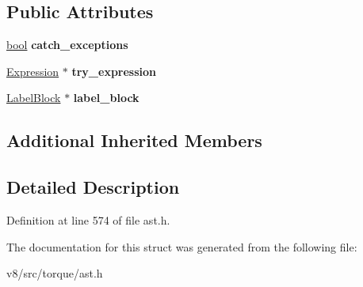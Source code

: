 \subsection*{Public Attributes}
\begin{DoxyCompactItemize}
\item 
\mbox{\label{structv8_1_1internal_1_1torque_1_1TryLabelExpression_a84238bda57547a7930639f5b25481db5}} 
\mbox{\hyperlink{classbool}{bool}} {\bfseries catch\+\_\+exceptions}
\item 
\mbox{\label{structv8_1_1internal_1_1torque_1_1TryLabelExpression_aabeb24711d6fd6e4ae83e3aa50ae45ab}} 
\mbox{\hyperlink{structv8_1_1internal_1_1torque_1_1Expression}{Expression}} $\ast$ {\bfseries try\+\_\+expression}
\item 
\mbox{\label{structv8_1_1internal_1_1torque_1_1TryLabelExpression_a968cd62b897e2f3369c058af42e52b42}} 
\mbox{\hyperlink{structv8_1_1internal_1_1torque_1_1LabelBlock}{Label\+Block}} $\ast$ {\bfseries label\+\_\+block}
\end{DoxyCompactItemize}
\subsection*{Additional Inherited Members}


\subsection{Detailed Description}


Definition at line 574 of file ast.\+h.



The documentation for this struct was generated from the following file\+:\begin{DoxyCompactItemize}
\item 
v8/src/torque/ast.\+h\end{DoxyCompactItemize}
